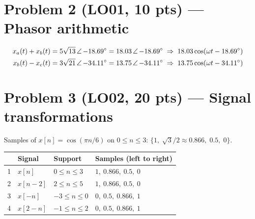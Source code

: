 \section*{Problem 2 \normalsize(LO01, 10 pts) --- Phasor arithmetic}

\begin{align*}
  x_a(t) + x_b(t) &= 5\sqrt{13}\,\angle\,\mathord{-18.69^\circ} = 18.03\,\angle\,\mathord{-18.69^\circ}
    \;\Rightarrow\; 18.03\cos(\omega t - 18.69^\circ) \\
  x_b(t) - x_c(t) &= 3\sqrt{21}\,\angle\,\mathord{-34.11^\circ} = 13.75\,\angle\,\mathord{-34.11^\circ}
    \;\Rightarrow\; 13.75\cos(\omega t - 34.11^\circ)
\end{align*}

\section*{Problem 3 \normalsize(LO02, 20 pts) --- Signal transformations}

Samples of $x[n] = \cos(\pi n/6)$ on $0 \le n \le 3$: \;$\{1,\; \sqrt{3}/2 \approx 0.866,\; 0.5,\; 0\}$.

\begin{center}
\begin{tabular}{llll}
  \toprule
  & Signal & Support & Samples (left to right) \\
  \midrule
  1 & $x[n]$    & $0 \le n \le 3$   & $1,\ 0.866,\ 0.5,\ 0$ \\
  2 & $x[n-2]$  & $2 \le n \le 5$   & $1,\ 0.866,\ 0.5,\ 0$ \\
  3 & $x[-n]$   & $-3 \le n \le 0$  & $0,\ 0.5,\ 0.866,\ 1$ \\
  4 & $x[2-n]$  & $-1 \le n \le 2$  & $0,\ 0.5,\ 0.866,\ 1$ \\
  \bottomrule
\end{tabular}
\end{center}

